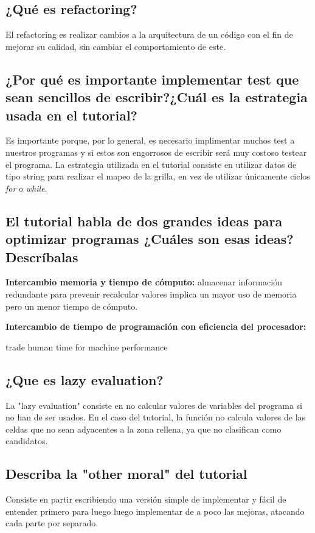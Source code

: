 \documentclass[10pt,a4paper]{article}
\begin{document}
\subsection{¿Qué es refactoring?}
El refactoring es realizar cambios a la arquitectura de un código con el fin de mejorar su calidad, sin cambiar el comportamiento de este. 

\subsection{¿Por qué es importante implementar test que sean sencillos de escribir?¿Cuál es la estrategia usada en el tutorial?}
Es importante porque, por lo general, es necesario implimentar muchos test a nuestros programas y si estos son engorrosos de escribir será muy costoso testear el programa. La estrategia utilizada en el tutorial consiste en utilizar datos de tipo string para realizar el mapeo de la grilla, en vez de utilizar únicamente ciclos \textit{for} o \textit{while}.

\subsection{El tutorial habla de dos grandes ideas para optimizar programas ¿Cuáles son esas ideas? Descríbalas}
\textbf{Intercambio memoria y tiempo de cómputo:} almacenar información redundante para prevenir recalcular valores implica un mayor uso de memoria pero un menor tiempo de cómputo.

\textbf{Intercambio de tiempo de programación con eficiencia del procesador:}

trade human time for machine performance
\subsection{¿Que es lazy evaluation?}
La "lazy evaluation" consiste en no calcular valores de variables del programa si no han de ser usados. En el caso del tutorial, la función no calcula valores de las celdas que no sean adyacentes a la zona rellena, ya que no clasifican como candidatos.

\subsection{Describa la "other moral" del tutorial}
Consiste en partir escribiendo una versión simple de implementar y fácil de entender primero para luego luego implementar de a poco las mejoras, atacando cada parte por separado.
\end{document}
